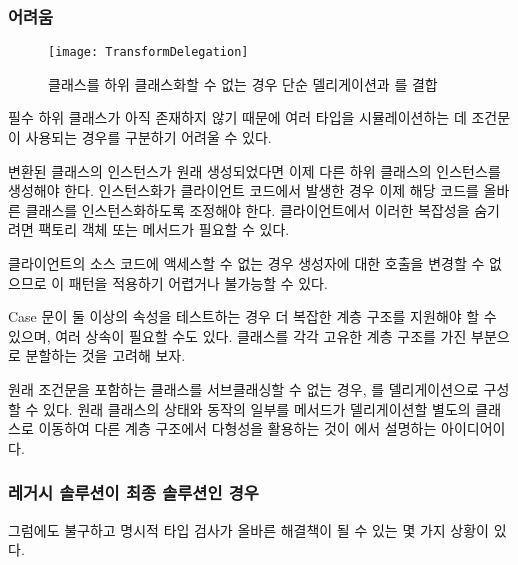 \documentclass[a4paper,10pt,twoside]{book}
\begin{document}
\subsubsection*{어려움}

\begin{figure}[tb]
\begin{center}
\texttt{[image: TransformDelegation]}
\caption{클래스를 하위 클래스화할 수 없는 경우 단순 델리게이션과 를 결합}
\end{center}
\end{figure}

\begin{bulletlist}
\item 필수 하위 클래스가 아직 존재하지 않기 때문에 여러 타입을 시뮬레이션하는 데 조건문이 사용되는 경우를 구분하기 어려울 수 있다.

\item 변환된 클래스의 인스턴스가 원래 생성되었다면 이제 다른 하위 클래스의 인스턴스를 생성해야 한다. 인스턴스화가 클라이언트 코드에서 발생한 경우 이제 해당 코드를 올바른 클래스를 인스턴스화하도록 조정해야 한다. 클라이언트에서 이러한 복잡성을 숨기려면 팩토리 객체 또는 메서드가 필요할 수 있다.

\item 클라이언트의 소스 코드에 액세스할 수 없는 경우 생성자에 대한 호출을 변경할 수 없으므로 이 패턴을 적용하기 어렵거나 불가능할 수 있다. 

\item Case 문이 둘 이상의 속성을 테스트하는 경우 더 복잡한 계층 구조를 지원해야 할 수 있으며, 여러 상속이 필요할 수도 있다. 클래스를 각각 고유한 계층 구조를 가진 부분으로 분할하는 것을 고려해 보자.

\item 원래 조건문을 포함하는 클래스를 서브클래싱할 수 없는 경우, 를 델리게이션으로 구성할 수 있다. 원래 클래스의 상태와 동작의 일부를 메서드가 델리게이션할 별도의 클래스로 이동하여 다른 계층 구조에서 다형성을 활용하는 것이 에서 설명하는 아이디어이다.
\end{bulletlist}

\subsubsection*{레거시 솔루션이 최종 솔루션인 경우}

그럼에도 불구하고 명시적 타입 검사가 올바른 해결책이 될 수 있는 몇 가지 상황이 있다.
\end{document}
